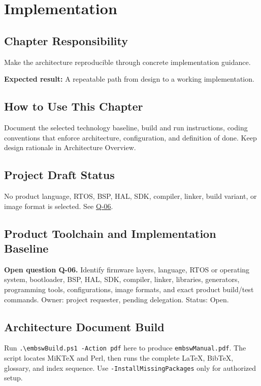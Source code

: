 \chapter{Implementation}
\section{Chapter Responsibility}
\label{Section:ImplementationResponsibility}
Make the architecture reproducible through concrete implementation guidance.

\noindent\textbf{Expected result:} A repeatable path from design to a working implementation.

\section{How to Use This Chapter}
Document the selected technology baseline, build and run instructions, coding conventions that enforce architecture, configuration, and definition of done. Keep design rationale in Architecture Overview.
\section{Project Draft Status}
No product language, RTOS, BSP, HAL, SDK, compiler, linker, build variant, or image format is selected. See \hyperref[Question:Q-06]{Q-06}.
\section{Product Toolchain and Implementation Baseline}
\label{Question:Q-06}
\par\noindent\textbf{Open question Q-06.} Identify firmware layers, language, RTOS or operating system, bootloader, BSP, HAL, SDK, compiler, linker, libraries, generators, programming tools, configurations, image formats, and exact product build/test commands. Owner: project requester, pending delegation. Status: Open.

\section{Architecture Document Build}
\label{Section:ProjectDocumentBuild}
Run \texttt{.\textbackslash embswBuild.ps1 -Action pdf} here to produce
\texttt{embswManual.pdf}. The script locates MiKTeX and Perl, then runs the
complete LaTeX, BibTeX, glossary, and index sequence.
Use \texttt{-InstallMissingPackages} only for authorized setup.
